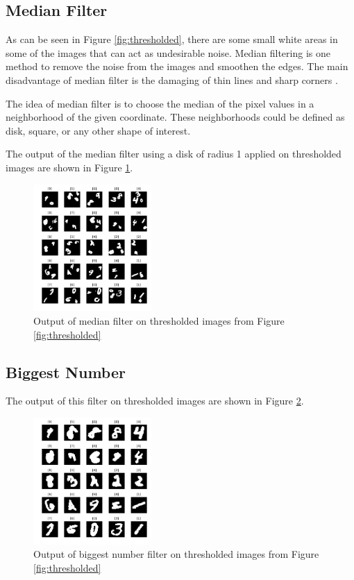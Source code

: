 \documentclass[letterpaper, 10 pt, conference]{ieeeconf}  %
\begin{document}
\subsection{Median Filter}
As can be seen in Figure \ref{fig:thresholded}, there are some small white areas in some of the images that can act as undesirable noise. Median filtering is one method to remove the noise from the images and smoothen the edges. The main disadvantage of median filter is the damaging of thin lines and sharp corners \cite{bovik2009essential}. 

The idea of median filter is to choose the median of the pixel values in a neighborhood of the given coordinate. These neighborhoods could be defined as disk, square, or any other shape of interest.


The output of the median filter using a disk of radius 1 applied on thresholded images are shown in Figure \ref{fig:thresholdmed}.
\begin{figure}[h]
	\begin{center}
		\includegraphics[width=0.4\textwidth]{figures/thresholdmedDataset.pdf}  %
		\caption{Output of median filter on thresholded images from Figure \ref{fig:thresholded}}
		\label{fig:thresholdmed}
	\end{center}
\end{figure}
\subsection{Biggest Number}
The output of this filter on thresholded images are shown in Figure \ref{fig:biggest}.
\begin{figure}[b]
	\begin{center}
		\includegraphics[width=0.4\textwidth]{figures/BiggestDataset.pdf}  %
		\caption{Output of biggest number filter on thresholded images from Figure \ref{fig:thresholded}}
		\label{fig:biggest}
	\end{center}
\end{figure}
\end{document}
